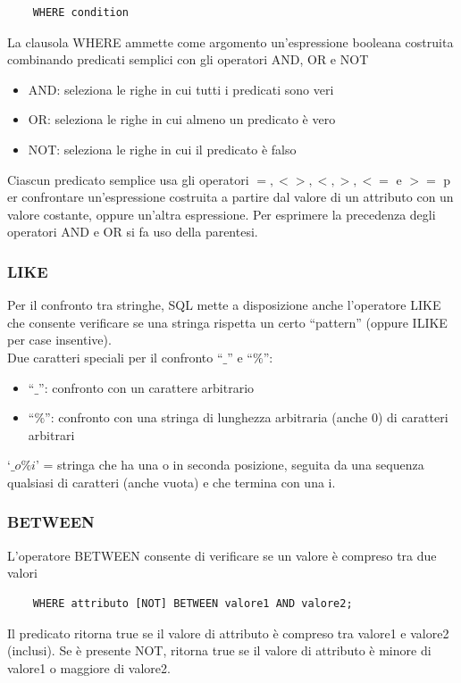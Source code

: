 \documentclass[a4paper]{article}
\begin{document}
\begin{verbatim}
    WHERE condition
\end{verbatim}
\noindent
La clausola WHERE ammette come argomento un’espressione booleana costruita
    combinando predicati semplici con gli operatori AND, OR e NOT
\begin{itemize}
    \item AND: seleziona le righe in cui tutti i predicati sono veri
    \item OR: seleziona le righe in cui almeno un predicato è vero
    \item NOT: seleziona le righe in cui il predicato è falso
\end{itemize}
\noindent
Ciascun predicato semplice usa gli operatori $= , <>, <, >, <=$ e $>=$ p
er confrontare un’espressione costruita a
partire dal valore di un attributo con un valore costante,
oppure un’altra espressione.
Per esprimere la precedenza degli operatori AND e OR si fa uso della parentesi.

\subsubsection{LIKE}

Per il confronto tra stringhe, SQL mette a disposizione anche
l’operatore LIKE che consente verificare se una stringa rispetta un certo
“pattern” (oppure ILIKE per case insentive). \\
Due caratteri speciali per il confronto “$\_$” e “$\%$”:
\begin{itemize}
    \item “$\_$”: confronto con un carattere arbitrario
    \item “$\%$”: confronto con una stringa di lunghezza arbitraria (anche 0) di caratteri
    arbitrari
\end{itemize}
‘$\_o\%i$’ = stringa che ha una o in seconda posizione, seguita da una
sequenza qualsiasi di caratteri (anche vuota) e che termina con una i.

\subsubsection{BETWEEN}

L’operatore BETWEEN consente di verificare se un valore è compreso tra due valori
\begin{verbatim}
    WHERE attributo [NOT] BETWEEN valore1 AND valore2;
\end{verbatim}
\noindent
Il predicato ritorna true se il valore di attributo è compreso tra valore1 e
valore2 (inclusi). Se è presente NOT, ritorna true se il valore di attributo è
minore di valore1 o maggiore di valore2.
\end{document}
